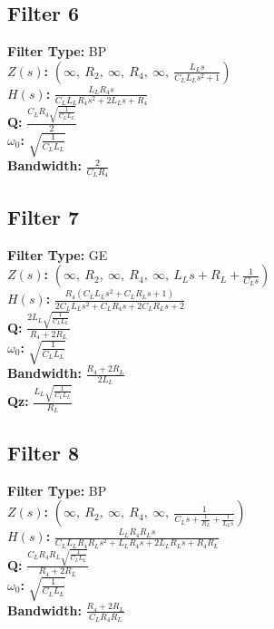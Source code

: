 \documentclass{article}
\begin{document}
\subsection*{Filter 6}
\textbf{Filter Type:} BP \\ 
\textbf{$Z(s)$:} $\left( \infty, \  R_{2}, \  \infty, \  R_{4}, \  \infty, \  \frac{L_{L} s}{C_{L} L_{L} s^{2} + 1}\right)$ \\ 
\textbf{$H(s)$:} $\frac{L_{L} R_{4} s}{C_{L} L_{L} R_{4} s^{2} + 2 L_{L} s + R_{4}}$ \\ 
\textbf{Q:} $\frac{C_{L} R_{4} \sqrt{\frac{1}{C_{L} L_{L}}}}{2}$ \\ 
\textbf{$\omega_0$:} $\sqrt{\frac{1}{C_{L} L_{L}}}$ \\ 
\textbf{Bandwidth:} $\frac{2}{C_{L} R_{4}}$ \\ 
\subsection*{Filter 7}
\textbf{Filter Type:} GE \\ 
\textbf{$Z(s)$:} $\left( \infty, \  R_{2}, \  \infty, \  R_{4}, \  \infty, \  L_{L} s + R_{L} + \frac{1}{C_{L} s}\right)$ \\ 
\textbf{$H(s)$:} $\frac{R_{4} \left(C_{L} L_{L} s^{2} + C_{L} R_{L} s + 1\right)}{2 C_{L} L_{L} s^{2} + C_{L} R_{4} s + 2 C_{L} R_{L} s + 2}$ \\ 
\textbf{Q:} $\frac{2 L_{L} \sqrt{\frac{1}{C_{L} L_{L}}}}{R_{4} + 2 R_{L}}$ \\ 
\textbf{$\omega_0$:} $\sqrt{\frac{1}{C_{L} L_{L}}}$ \\ 
\textbf{Bandwidth:} $\frac{R_{4} + 2 R_{L}}{2 L_{L}}$ \\ 
\textbf{Qz:} $\frac{L_{L} \sqrt{\frac{1}{C_{L} L_{L}}}}{R_{L}}$ \\ 
\subsection*{Filter 8}
\textbf{Filter Type:} BP \\ 
\textbf{$Z(s)$:} $\left( \infty, \  R_{2}, \  \infty, \  R_{4}, \  \infty, \  \frac{1}{C_{L} s + \frac{1}{R_{L}} + \frac{1}{L_{L} s}}\right)$ \\ 
\textbf{$H(s)$:} $\frac{L_{L} R_{4} R_{L} s}{C_{L} L_{L} R_{4} R_{L} s^{2} + L_{L} R_{4} s + 2 L_{L} R_{L} s + R_{4} R_{L}}$ \\ 
\textbf{Q:} $\frac{C_{L} R_{4} R_{L} \sqrt{\frac{1}{C_{L} L_{L}}}}{R_{4} + 2 R_{L}}$ \\ 
\textbf{$\omega_0$:} $\sqrt{\frac{1}{C_{L} L_{L}}}$ \\ 
\textbf{Bandwidth:} $\frac{R_{4} + 2 R_{L}}{C_{L} R_{4} R_{L}}$ \\ 
\end{document}
